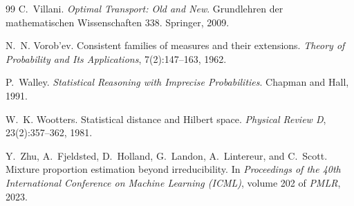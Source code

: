 \documentclass[11pt]{article}
\theoremstyle{definition}
\theoremstyle{remark}
\begin{document}
\begin{thebibliography}{99}
C.~Villani.
\newblock \emph{Optimal Transport: Old and New}.
\newblock Grundlehren der mathematischen Wissenschaften 338. Springer, 2009.

N.~N. Vorob'ev.
\newblock Consistent families of measures and their extensions.
\newblock \emph{Theory of Probability and Its Applications}, 7(2):147--163, 1962.

P.~Walley.
\newblock \emph{Statistical Reasoning with Imprecise Probabilities}.
\newblock Chapman and Hall, 1991.

W.~K. Wootters.
\newblock Statistical distance and {H}ilbert space.
\newblock \emph{Physical Review D}, 23(2):357--362, 1981.

Y.~Zhu, A.~Fjeldsted, D.~Holland, G.~Landon, A.~Lintereur, and C.~Scott.
\newblock Mixture proportion estimation beyond irreducibility.
\newblock In \emph{Proceedings of the 40th International Conference on Machine Learning (ICML)},
  volume 202 of \emph{PMLR}, 2023.

\end{thebibliography}
\end{document}
